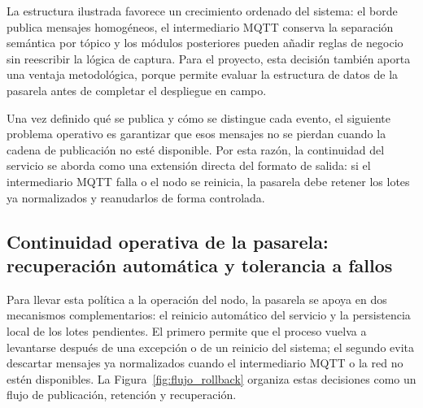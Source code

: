 La estructura ilustrada favorece un crecimiento ordenado del sistema: el borde publica mensajes homogéneos, el intermediario \ac{MQTT} conserva la separación semántica por tópico y los módulos posteriores pueden añadir reglas de negocio sin reescribir la lógica de captura. Para el proyecto, esta decisión también aporta una ventaja metodológica, porque permite evaluar la estructura de datos de la pasarela antes de completar el despliegue en campo.

Una vez definido qué se publica y cómo se distingue cada evento, el siguiente problema operativo es garantizar que esos mensajes no se pierdan cuando la cadena de publicación no esté disponible. Por esta razón, la continuidad del servicio se aborda como una extensión directa del formato de salida: si el intermediario \ac{MQTT} falla o el nodo se reinicia, la pasarela debe retener los lotes ya normalizados y reanudarlos de forma controlada.

\subsection{Continuidad operativa de la pasarela: recuperación automática y tolerancia a fallos}
Para llevar esta política a la operación del nodo, la pasarela se apoya en dos mecanismos complementarios: el reinicio automático del servicio y la persistencia local de los lotes pendientes. El primero permite que el proceso vuelva a levantarse después de una excepción o de un reinicio del sistema; el segundo evita descartar mensajes ya normalizados cuando el intermediario \ac{MQTT} o la red no estén disponibles. La Figura~\ref{fig:flujo_rollback} organiza estas decisiones como un flujo de publicación, retención y recuperación.

